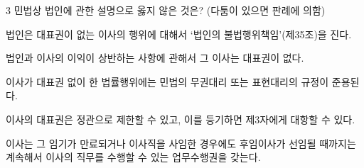 \begin{question}{3}
민법상 법인에 관한 설명으로 옳지 않은 것은? (다툼이 있으면 판례에 의함)
\begin{choices}
  \item 법인은 대표권이 없는 이사의 행위에 대해서 ‘법인의 불법행위책임’(제35조)을 진다.
  \item 법인과 이사의 이익이 상반하는 사항에 관해서 그 이사는 대표권이 없다.
  \item 이사가 대표권 없이 한 법률행위에는 민법의 무권대리 또는 표현대리의 규정이 준용된다.
  \item 이사의 대표권은 정관으로 제한할 수 있고, 이를 등기하면 제3자에게 대항할 수 있다.
  \item 이사는 그 임기가 만료되거나 이사직을 사임한 경우에도 후임이사가 선임될 때까지는 계속해서 이사의 직무를 수행할 수 있는 업무수행권을 갖는다.
\end{choices}
\end{question}
